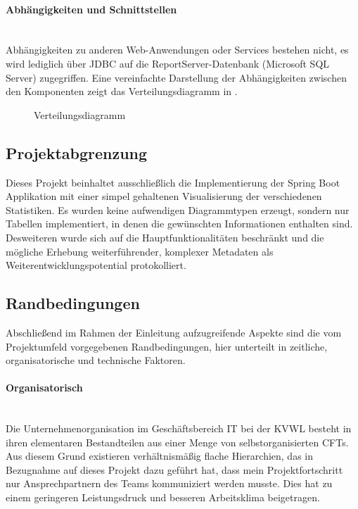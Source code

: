 \paragraph{Abhängigkeiten und Schnittstellen} ~\\
\label{p:Abhaengigkeiten}
Abhängigkeiten zu anderen Web-Anwendungen oder Services bestehen nicht, es wird lediglich über \ac{JDBC} auf die ReportServer-Datenbank (Microsoft SQL Server) zugegriffen. Eine vereinfachte Darstellung der Abhängigkeiten zwischen den Komponenten zeigt das Verteilungsdiagramm in .
\begin{figure}[htb]
\centering
{}
\caption{Verteilungsdiagramm}
\label{fig:Deployment}
\end{figure} 

\subsection{Projektabgrenzung} 
\label{sec:Projektabgrenzung}
Dieses Projekt beinhaltet ausschließlich die Implementierung der Spring Boot Applikation mit einer simpel gehaltenen Visualisierung der verschiedenen Statistiken. Es wurden keine aufwendigen Diagrammtypen erzeugt, sondern nur Tabellen implementiert, in denen die gewünschten Informationen enthalten sind.
Desweiteren wurde sich auf die Hauptfunktionalitäten beschränkt und die mögliche Erhebung weiterführender, komplexer Metadaten als Weiterentwicklungspotential protokolliert.

\subsection{Randbedingungen} 
\label{sec:Randbedingungen}
Abschließend im Rahmen der Einleitung aufzugreifende Aspekte sind die vom Projektumfeld vorgegebenen Randbedingungen, hier unterteilt in zeitliche, organisatorische und technische Faktoren.

\paragraph{Organisatorisch} ~\\
\label{p:Randbedingungen:Organisatorisch}
Die Unternehmenorganisation im Geschäftsbereich IT bei der \ac{KVWL} besteht in ihren elementaren Bestandteilen aus einer Menge von selbstorganisierten \ac{CFT}s. Aus diesem Grund existieren verhältnismäßig flache Hierarchien, das in Bezugnahme auf dieses Projekt dazu geführt hat, dass mein Projektfortschritt nur Ansprechpartnern des Teams kommuniziert werden musste. Dies hat zu einem geringeren Leistungsdruck und besseren Arbeitsklima beigetragen.

